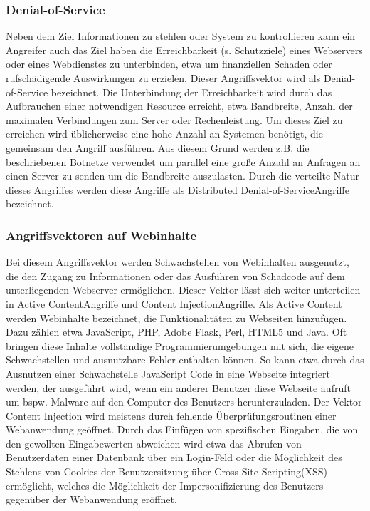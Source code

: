 \subsubsection{Denial-of-Service}
Neben dem Ziel Informationen zu stehlen oder System zu kontrollieren kann ein Angreifer auch das Ziel haben die Erreichbarkeit (s. Schutzziele) eines Webservers oder eines Webdienstes zu unterbinden, etwa um finanziellen Schaden oder rufschädigende Auswirkungen zu erzielen. Dieser Angriffsvektor wird als \glqq Denial-of-Service \grqq  bezeichnet. Die Unterbindung der Erreichbarkeit wird durch das Aufbrauchen einer notwendigen Resource erreicht, etwa Bandbreite, Anzahl der maximalen Verbindungen zum Server oder Rechenleistung. Um dieses Ziel zu erreichen wird üblicherweise eine hohe Anzahl an Systemen benötigt, die gemeinsam den Angriff ausführen. Aus diesem Grund werden z.B. die beschriebenen Botnetze verwendet um parallel eine große Anzahl an Anfragen an einen Server zu senden um die Bandbreite auszulasten. Durch die verteilte Natur dieses Angriffes werden diese Angriffe als \glqq Distributed Denial-of-Service\grqq  Angriffe bezeichnet.

\subsubsection{Angriffsvektoren auf Webinhalte}
Bei diesem Angriffsvektor werden Schwachstellen von Webinhalten ausgenutzt, die den Zugang zu Informationen oder das Ausführen von Schadcode auf dem unterliegenden Webserver ermöglichen. Dieser Vektor lässt sich weiter unterteilen in \glqq Active Content\grqq  Angriffe und \glqq Content Injection\grqq  Angriffe. 
Als Active Content werden Webinhalte bezeichnet, die Funktionalitäten zu Webseiten hinzufügen. Dazu zählen etwa JavaScript, PHP, Adobe Flask, Perl, HTML5 und Java. Oft bringen diese Inhalte vollständige Programmierumgebungen mit sich, die eigene Schwachstellen und ausnutzbare Fehler enthalten können. So kann etwa durch das Ausnutzen einer Schwachstelle JavaScript Code in eine Webseite integriert werden, der ausgeführt wird, wenn ein anderer Benutzer diese Webseite aufruft um bspw. Malware auf den Computer des Benutzers herunterzuladen. 
Der Vektor Content Injection wird meistens durch fehlende Überprüfungsroutinen einer Webanwendung geöffnet. Durch das Einfügen von spezifischen Eingaben, die von den gewollten Eingabewerten abweichen wird etwa das Abrufen von Benutzerdaten einer Datenbank über ein Login-Feld oder die Möglichkeit des Stehlens von Cookies der Benutzersitzung über \glqq Cross-Site Scripting\grqq  (XSS) ermöglicht, welches die Möglichkeit der Impersonifizierung des Benutzers gegenüber der Webanwendung eröffnet.

